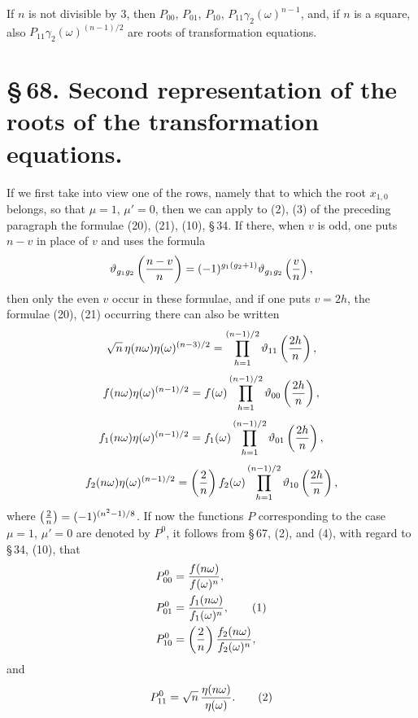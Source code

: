 \documentclass[11pt]{article}
\begin{document}
If $n$ is not divisible by $3$, then $P_{00}$, $P_{01}$, $P_{10}$, $P_{11}\gamma_2(\omega)^{n-1}$, and, if $n$ is a square, also $P_{11}\gamma_2(\omega)^{(n-1)/2}$ are roots of transformation equations.

\section*{\S\,68. Second representation of the roots of the transformation equations.}

If we first take into view one of the rows, namely that to which the root $x_{1,0}$ belongs, so that $\mu=1$, $\mu'=0$, then we can apply to (2), (3) of the preceding paragraph the formulae (20), (21), (10), \S\,34. If there, when $v$ is odd, one puts $n-v$ in place of $v$ and uses the formula
\[
\vartheta_{g_1g_2}\left({n-v\over n}\right)=(-1)^{g_1(g_2+1)}\vartheta_{g_1g_2}\left({v\over n}\right),
\]
then only the even $v$ occur in these formulae, and if one puts $v=2h$, the formulae (20), (21) occurring there can also be written
\[
\sqrt n\,\eta(n\omega)\eta(\omega)^{(n-3)/2}
=\prod_{h=1}^{(n-1)/2}\vartheta_{11}\left({2h\over n}\right),
\]
\[
f(n\omega)\eta(\omega)^{(n-1)/2}=f(\omega)\prod_{h=1}^{(n-1)/2}\vartheta_{00}\left({2h\over n}\right),
\]
\[
f_1(n\omega)\eta(\omega)^{(n-1)/2}=f_1(\omega)\prod_{h=1}^{(n-1)/2}\vartheta_{01}\left({2h\over n}\right),
\]
\[
f_2(n\omega)\eta(\omega)^{(n-1)/2}=\left({2\over n}\right)f_2(\omega)\prod_{h=1}^{(n-1)/2}\vartheta_{10}\left({2h\over n}\right),
\]
where $\left({2\over n}\right)=(-1)^{(n^2-1)/8}$. If now the functions $P$ corresponding to the case $\mu=1$, $\mu'=0$ are denoted by $P^0$, it follows from \S\,67, (2), and (4), with regard to \S\,34, (10), that
\begin{align}
P_{00}^0&={f(n\omega)\over f(\omega)^n},\notag\\
P_{01}^0&={f_1(n\omega)\over f_1(\omega)^n},\tag{1}\\
P_{10}^0&=\left({2\over n}\right){f_2(n\omega)\over f_2(\omega)^n},\notag
\end{align}
and
\begin{equation}
P_{11}^0=\sqrt n\,{\eta(n\omega)\over\eta(\omega)}.
\tag{2}
\end{equation}
\end{document}
